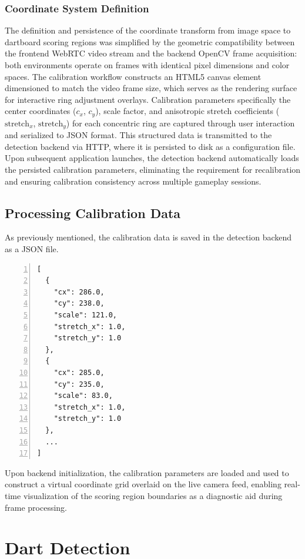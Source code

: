 \subsubsection{Coordinate System Definition}
The definition and persistence of the coordinate transform from image space to dartboard scoring regions was simplified by the geometric compatibility between the frontend WebRTC video stream and the backend OpenCV frame acquisition: both environments operate on frames with identical pixel dimensions and color spaces. The calibration workflow constructs an HTML5 canvas element dimensioned to match the video frame size, which serves as the rendering surface for interactive ring adjustment overlays. Calibration parameters specifically the center coordinates ($c_x$, $c_y$), scale factor, and anisotropic stretch coefficients ($\text{stretch}_x$, $\text{stretch}_y$) for each concentric ring are captured through user interaction and serialized to JSON format. This structured data is transmitted to the detection backend via HTTP, where it is persisted to disk as a configuration file. Upon subsequent application launches, the detection backend automatically loads the persisted calibration parameters, eliminating the requirement for recalibration and ensuring calibration consistency across multiple gameplay sessions. 
\subsection{Processing Calibration Data}
As previously mentioned, the calibration data is saved in the detection backend as a JSON file. 
\begin{lstlisting}[numbers=left,caption=Example of the calibration data JSON file, label=lst:calibration_data]
[
  {
    "cx": 286.0,
    "cy": 238.0,
    "scale": 121.0,
    "stretch_x": 1.0,
    "stretch_y": 1.0
  },
  {
    "cx": 285.0,
    "cy": 235.0,
    "scale": 83.0,
    "stretch_x": 1.0,
    "stretch_y": 1.0
  },
  ...
]
\end{lstlisting}

Upon backend initialization, the calibration parameters are loaded and used to construct a virtual coordinate grid overlaid on the live camera feed, enabling real-time visualization of the scoring region boundaries as a diagnostic aid during frame processing.

\setauthor{\secondauthor}

\section{Dart Detection}
